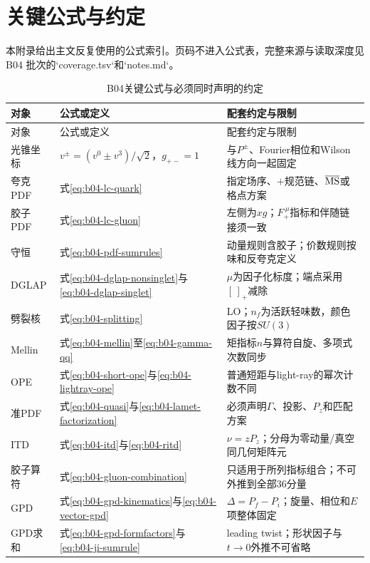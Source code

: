 \chapter{关键公式与约定}

本附录给出主文反复使用的公式索引。页码不进入公式表，完整来源与读取深度见B04
批次的`coverage.tsv`和`notes.md`。

\begin{longtable}{@{}p{}p{}p{}@{}}
  \caption{B04关键公式与必须同时声明的约定}\label{tab:b04-formula-reference}\\
  \toprule
  对象 & 公式或定义 & 配套约定与限制 \\
  \midrule
  \endfirsthead
  \toprule
  对象 & 公式或定义 & 配套约定与限制 \\
  \midrule
  \endhead
  \bottomrule
  \endfoot
  光锥坐标 & $v^\pm=(v^0\pm v^3)/\sqrt2$，$g_{+-}=1$ & 与$P^\pm$、Fourier相位和Wilson线方向一起固定 \\
  夸克PDF & 式\eqref{eq:b04-lc-quark} & 指定场序、$+$规范链、$\overline{\rm MS}$或格点方案 \\
  胶子PDF & 式\eqref{eq:b04-lc-gluon} & 左侧为$xg$；$F_{+}^{\ \mu}$指标和伴随链接须一致 \\
  守恒 & 式\eqref{eq:b04-pdf-sumrules} & 动量规则含胶子；价数规则按味和反夸克定义 \\
  DGLAP & 式\eqref{eq:b04-dglap-nonsinglet}与\eqref{eq:b04-dglap-singlet} & $\mu$为因子化标度；端点采用$[\,]_+$减除 \\
  劈裂核 & 式\eqref{eq:b04-splitting} & LO；$n_f$为活跃轻味数，颜色因子按$SU(3)$ \\
  Mellin & 式\eqref{eq:b04-mellin}至\eqref{eq:b04-gamma-qq} & 矩指标$n$与算符自旋、多项式次数同步 \\
  OPE & 式\eqref{eq:b04-short-ope}与\eqref{eq:b04-lightray-ope} & 普通短距与light-ray的幂次计数不同 \\
  准PDF & 式\eqref{eq:b04-quasi}与\eqref{eq:b04-lamet-factorization} & 必须声明$\Gamma$、投影、$P_z$和匹配方案 \\
  ITD & 式\eqref{eq:b04-itd}与\eqref{eq:b04-ritd} & $\nu=zP_z$；分母为零动量/真空同几何矩阵元 \\
  胶子算符 & 式\eqref{eq:b04-gluon-combination} & 只适用于所列指标组合；不可外推到全部36分量 \\
  GPD & 式\eqref{eq:b04-gpd-kinematics}与\eqref{eq:b04-vector-gpd} & $\Delta=P_f-P_i$；旋量、相位和$E$项整体固定 \\
  GPD求和 & 式\eqref{eq:b04-gpd-formfactors}与\eqref{eq:b04-ji-sumrule} & leading twist；形状因子与$t\to0$外推不可省略 \\
\end{longtable}

